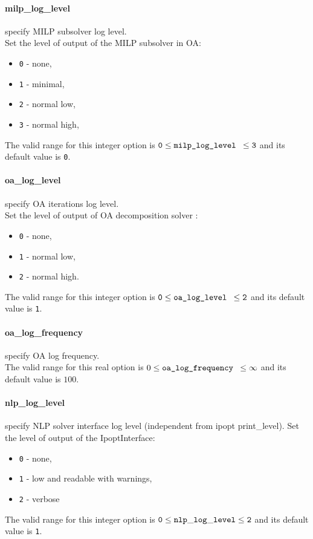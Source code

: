 \paragraph{milp\_log\_level} specify MILP subsolver log level.\\
 Set the level of output of the MILP subsolver in OA:
 \begin{itemize}
  \item {\tt 0} - none,
  \item {\tt 1} - minimal,
  \item {\tt 2} - normal low,
  \item {\tt 3} - normal high,
  \end{itemize}
The valid range for this integer option is
${\tt 0} \le \hbox{\tt milp\_log\_level } \le {\tt 3}$
and its default value is {\tt 0}.

\paragraph{oa\_log\_level} specify OA iterations log level.\\
 Set the level of output of OA decomposition solver :
 \begin{itemize}
  \item {\tt 0} - none,
  \item {\tt 1} - normal low,
  \item {\tt 2} - normal high.
  \end{itemize}
  The valid range for this integer option is
  ${\tt 0} \le \hbox{\tt oa\_log\_level } \le {\tt 2}$
  and its default value is {\tt 1}.

\paragraph{oa\_log\_frequency} specify OA log frequency. \\
  The valid range for this real option is
  $ 0 \le \hbox{\tt oa\_log\_frequency } \le \infty $
  and its default value is $100$.



\paragraph{nlp\_log\_level} specify NLP solver interface log level (independent from ipopt print\_level).
  Set the level of output of the IpoptInterface:
  \begin{itemize}
  \item {\tt 0} - none,
  \item {\tt 1} - low and readable with warnings,
  \item {\tt 2} - verbose
  \end{itemize}
 The valid range for this integer option is
${\tt 0} \le {\tt nlp\_log\_level } \le {\tt 2}$
and its default value is {\tt 1}.


